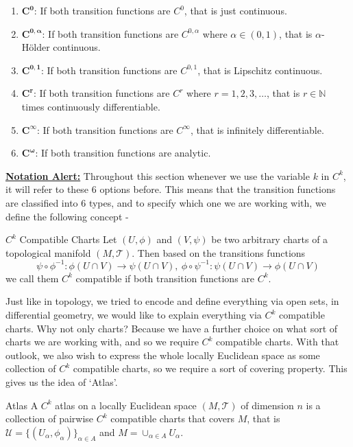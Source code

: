 \begin{enumerate}
	\item $\pmb{C^0}$: If both transition functions are $C^0$, that is just continuous.
	\item $\pmb{C^{0,\alpha}}$: If both transition functions are $C^{0,\alpha}$ where $\alpha\in(0,1)$, that is $\alpha$-Hölder continuous.
	\item $\pmb{C^{0,1}}$: If both transition functions are $C^{0,1}$, that is Lipschitz continuous.
	\item $\pmb{C^r}$: If both transition functions are $C^r$ where $r=1,2,3,\dots$, that is $r\in\mathbb{N}$ times continuously differentiable.
	\item $\pmb{C^{\infty}}$: If both transition functions are $C^{\infty}$, that is infinitely differentiable.
	\item $\pmb{C^{\omega}}$: If both transition functions are analytic.
\end{enumerate}
\underline{\textbf{Notation Alert:}} Throughout this section whenever we use the variable $k$ in $C^k$, it will refer to these 6 options before. This means that the transition functions are classified into 6 types, and to specify which one we are working with, we define the following concept -
\begin{Definition}{$C^k$ Compatible Charts}\label{c^k_compatible_charts}
	Let $(U,\phi)$ and $(V,\psi)$ be two arbitrary charts of a topological manifold $(M,\mathcal{T})$. Then based on the transitions functions $$ \psi\circ\phi^{-1}:\phi(U\cap V)\to\psi(U\cap V),\ \phi\circ\psi^{-1}:\psi(U\cap V)\to\phi(U\cap V)$$ we call them $C^k$ compatible if both transition functions are $C^k$.
\end{Definition}
\noindent Just like in topology, we tried to encode and define everything via open sets, in differential geometry, we would like to explain everything via $C^k$ compatible charts. Why not only charts? Because we have a further choice on what sort of charts we are working with, and so we require $C^k$ compatible charts. With that outlook, we also wish to express the whole locally Euclidean space as some collection of $C^k$ compatible charts, so we require a sort of covering property. This gives us the idea of `Atlas'.
\begin{Definition}{Atlas}\label{atlas}
	A $C^k$ atlas on a locally Euclidean space $(M,\mathcal{T})$ of dimension $n$ is a collection of pairwise $C^k$ compatible charts that covers $M$, that is $\mathcal{U}=\{(U_{\alpha},\phi_{\alpha})\}_{\alpha\in A}$ and $M=\cup_{\alpha\in A}U_{\alpha}$.
\end{Definition}

